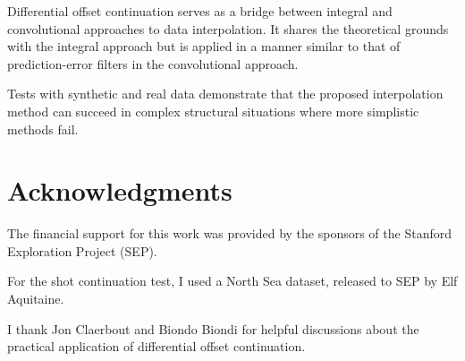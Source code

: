 Differential offset continuation serves as a bridge between integral
and convolutional approaches to data interpolation. It shares the
theoretical grounds with the integral approach but is applied in a
manner similar to that of prediction-error filters in the
convolutional approach.

Tests with synthetic and real data demonstrate that the proposed
interpolation method can succeed in complex structural situations
where more simplistic methods fail.

\section{Acknowledgments}

The financial support for this work was provided by the sponsors of
the Stanford Exploration Project (SEP).


For the shot continuation test, I used a
North Sea dataset, released to SEP by Elf Aquitaine.

I thank Jon Claerbout and Biondo Biondi for helpful discussions about
the practical application of differential offset continuation.




